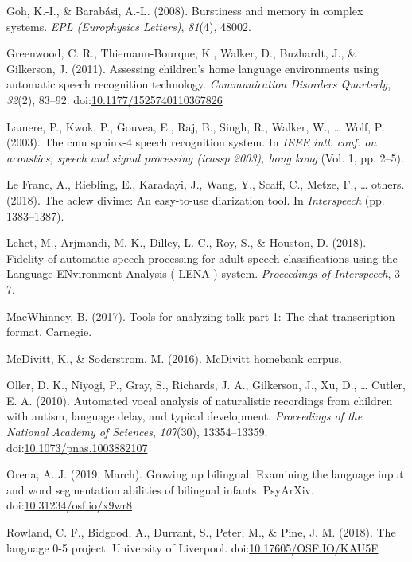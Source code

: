 \documentclass[english,floatsintext,man]{apa6}
\begin{document}
\hypertarget{ref-goh2008burstiness}{}
Goh, K.-I., \& Barabási, A.-L. (2008). Burstiness and memory in complex
systems. \emph{EPL (Europhysics Letters)}, \emph{81}(4), 48002.

\hypertarget{ref-Greenwood2011}{}
Greenwood, C. R., Thiemann-Bourque, K., Walker, D., Buzhardt, J., \&
Gilkerson, J. (2011). Assessing children's home language environments
using automatic speech recognition technology. \emph{Communication
Disorders Quarterly}, \emph{32}(2), 83--92.
doi:\href{https://doi.org/10.1177/1525740110367826}{10.1177/1525740110367826}

\hypertarget{ref-lamere2003cmu}{}
Lamere, P., Kwok, P., Gouvea, E., Raj, B., Singh, R., Walker, W.,
\ldots{} Wolf, P. (2003). The cmu sphinx-4 speech recognition system. In
\emph{IEEE intl. conf. on acoustics, speech and signal processing
(icassp 2003), hong kong} (Vol. 1, pp. 2--5).

\hypertarget{ref-le2018aclew}{}
Le Franc, A., Riebling, E., Karadayi, J., Wang, Y., Scaff, C., Metze,
F., \ldots{} others. (2018). The aclew divime: An easy-to-use
diarization tool. In \emph{Interspeech} (pp. 1383--1387).

\hypertarget{ref-Lehet2018}{}
Lehet, M., Arjmandi, M. K., Dilley, L. C., Roy, S., \& Houston, D.
(2018). Fidelity of automatic speech processing for adult speech
classifications using the Language ENvironment Analysis ( LENA ) system.
\emph{Proceedings of Interspeech}, 3--7.

\hypertarget{ref-macwhinney2017tools}{}
MacWhinney, B. (2017). Tools for analyzing talk part 1: The chat
transcription format. Carnegie.

\hypertarget{ref-mcdivitt2016mcdivitt}{}
McDivitt, K., \& Soderstrom, M. (2016). McDivitt homebank corpus.

\hypertarget{ref-Oller}{}
Oller, D. K., Niyogi, P., Gray, S., Richards, J. A., Gilkerson, J., Xu,
D., \ldots{} Cutler, E. A. (2010). Automated vocal analysis of
naturalistic recordings from children with autism, language delay, and
typical development. \emph{Proceedings of the National Academy of
Sciences}, \emph{107}(30), 13354--13359.
doi:\href{https://doi.org/10.1073/pnas.1003882107}{10.1073/pnas.1003882107}

\hypertarget{ref-orena_2019}{}
Orena, A. J. (2019, March). Growing up bilingual: Examining the language
input and word segmentation abilities of bilingual infants. PsyArXiv.
doi:\href{https://doi.org/10.31234/osf.io/x9wr8}{10.31234/osf.io/x9wr8}

\hypertarget{ref-rowland2018}{}
Rowland, C. F., Bidgood, A., Durrant, S., Peter, M., \& Pine, J. M.
(2018). The language 0-5 project. University of Liverpool.
doi:\href{https://doi.org/10.17605/OSF.IO/KAU5F}{10.17605/OSF.IO/KAU5F}
\end{document}
